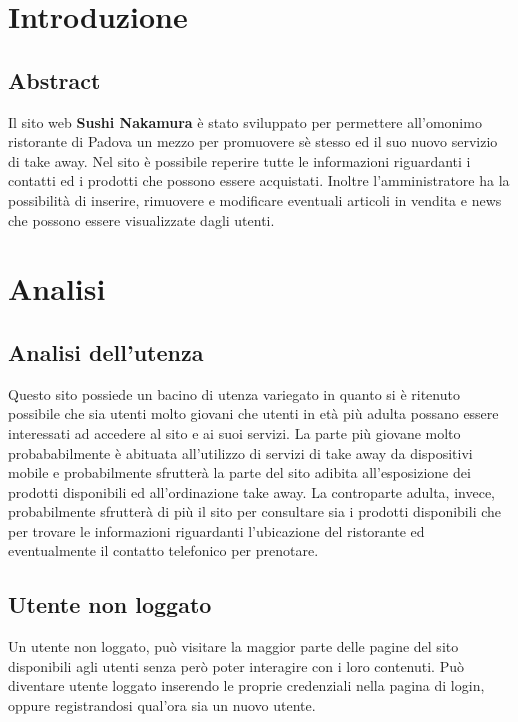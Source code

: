 \documentclass{article}
\begin{document}
	\clearpage
	\renewcommand*\contentsname{Indice}
	\tableofcontents	
	\newpage
	
	\section{Introduzione}
		\subsection{Abstract}
			Il sito web \textbf{Sushi Nakamura} è stato sviluppato per permettere all'omonimo ristorante di Padova un mezzo per promuovere sè stesso ed il suo nuovo servizio di take away.
			Nel sito è possibile reperire tutte le informazioni riguardanti i contatti ed i prodotti che possono essere acquistati.
			Inoltre l'amministratore ha la possibilità di inserire, rimuovere e modificare eventuali articoli in vendita e news che possono essere visualizzate dagli utenti.
	\section{Analisi}
		\subsection{Analisi dell'utenza}
			Questo sito possiede un bacino di utenza variegato in quanto si è ritenuto possibile che sia utenti molto giovani che utenti in età più adulta possano essere interessati ad accedere al sito e ai suoi servizi.
			La parte più giovane molto probababilmente è abituata all'utilizzo di servizi di take away da dispositivi mobile e probabilmente sfrutterà la parte del sito adibita all'esposizione dei prodotti disponibili ed all'ordinazione take away.
			La controparte adulta, invece, probabilmente sfrutterà di più il sito per consultare sia i prodotti disponibili che per trovare le informazioni riguardanti l'ubicazione del ristorante ed eventualmente il contatto telefonico per prenotare. 
			\subsection{Utente non loggato}
			    Un utente non loggato, può visitare la maggior parte delle pagine del sito disponibili agli utenti senza però poter interagire con i loro contenuti. Può diventare utente loggato inserendo le proprie credenziali nella pagina di login, oppure registrandosi qual'ora sia un nuovo utente.
\end{document}
